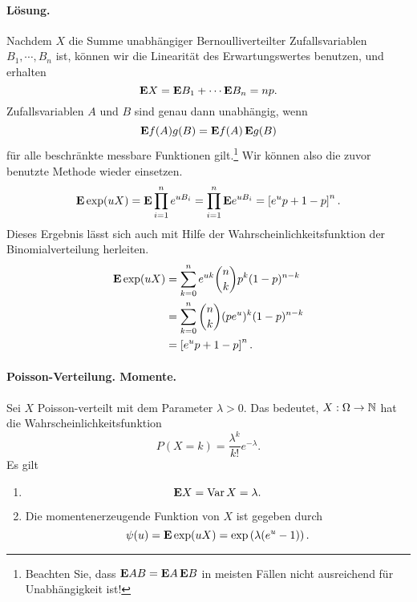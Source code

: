 \paragraph*{Lösung. }
Nachdem $X$ die Summe unabhängiger Bernoulliverteilter Zufallsvariablen $B_1,
\cdots, B_n$ ist, können wir die Linearität des Erwartungswertes benutzen, und
erhalten
\begin{equation*}
    \mathbf{E} X = \mathbf{E} B_1 + \cdots \mathbf{E} B_n = np. 
\end{equation*}
Zufallsvariablen $A$ und $B$ sind genau dann unabhängig, wenn 
\begin{equation*}
    \mathbf{E} f(A)g(B) = \mathbf{E} f(A)\, \mathbf{E} g(B)
\end{equation*}
für alle beschränkte messbare Funktionen gilt.\footnote{Beachten Sie, dass $\mathbf{E}
AB = \mathbf{E} A\, \mathbf{E} B$ in meisten Fällen nicht ausreichend für Unabhängigkeit ist!}
Wir können also die zuvor benutzte Methode wieder einsetzen. 
\begin{equation*}
    \mathbf{E} \exp (u X) = \mathbf{E} \prod_{i=1}^{n} e^{u B_i} 
    = \prod_{i=1}^{n} \mathbf{E} e^{u B_i} 
    = \left[ e^{u}p + 1 -p \right]^{n}.
\end{equation*}
Dieses Ergebnis lässt sich auch mit Hilfe der Wahrscheinlichkeitsfunktion der 
Binomialverteilung herleiten. 
\begin{align*}
    \mathbf{E} \exp (u X) &= \sum_{k=0}^{n} e^{u k} \binom{n}{k} p^{k}(1-p)^{n-k} \\
    &= \sum_{k=0}^{n} \binom{n}{k} (p e^{u})^{k}(1-p)^{n-k} \\
    &= \left[ e^u p + 1-p \right]^n.
\end{align*}

\paragraph{Poisson-Verteilung. Momente. } 
Sei $X$ Poisson-verteilt mit dem Parameter $\lambda>0$. Das bedeutet, $X:\Omega\to\mathbb N$
hat die Wahrscheinlichkeitsfunktion 
\begin{equation*}
    P(X = k) = \frac{\lambda^{k}}{k!} e^{-\lambda}.
\end{equation*}
Es gilt
\begin{enumerate}
    \item 
        \begin{equation*}
            \mathbf{E} X = \operatorname{Var} X = \lambda.
        \end{equation*}
    \item Die momentenerzeugende Funktion von $X$ ist gegeben durch
        \begin{equation*}
            \psi(u) = \mathbf{E} \exp(uX) = \exp \left( \lambda(e^u - 1) \right).
        \end{equation*}
\end{enumerate}

